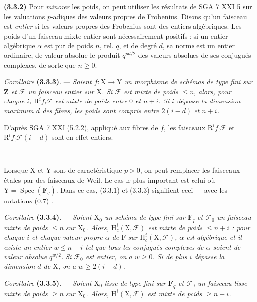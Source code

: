 \documentclass[11pt,leqno]{article}
\newcommand{\Page}[1]{\ifvmode\noindent\else\unskip\ \fi{\footnotesize\textcolor{gray}{[p.\,#1]}}\ \ignorespaces}
\begin{document}
\textbf{(3.3.2)} Pour \textit{minorer} les poids, on peut utiliser les résultats de SGA 7 XXI 5 sur les valuations \(p\)-adiques des valeurs propres de Frobenius. Disons qu’un faisceau est \textit{entier} si les valeurs propres des Frobenius sont des entiers algébriques. Les poids d’un faisceau mixte entier sont nécessairement positifs : si un entier algébrique \(\alpha\) est pur de poids \(n\), rel. \(q\), et de degré \(d\), sa norme est un entier ordinaire, de valeur absolue le produit \(q^{nd/2}\) des valeurs absolues de ses conjugués complexes, de sorte que \(n\geq0\).

\textit{Corollaire} \textbf{(3.3.3)}. — \textit{Soient \(f:\mathrm{X}\to\mathrm{Y}\) un morphisme de schémas de type fini sur \(\mathbf{Z}\) et \(\mathscr{F}\) un faisceau entier sur \(\mathrm{X}\). Si \(\mathscr{F}\) est mixte de poids \(\leq n\), alors, pour chaque \(i\), \(\mathrm{R}^if_!\mathscr{F}\) est mixte de poids entre \(0\) et \(n+i\). Si \(i\) dépasse la dimension maximum \(d\) des fibres, les poids sont compris entre \(2(i-d)\) et \(n+i\).}

D’après SGA 7 XXI (5.2.2), appliqué aux fibres de \(f\), les faisceaux \(\mathrm{R}^if_!\mathscr{F}\) et \(\mathrm{R}^if_!\mathscr{F}(i-d)\) sont en effet entiers.

\Page{206}

Lorsque \(\mathrm{X}\) et \(\mathrm{Y}\) sont de caractéristique \(p>0\), on peut remplacer les faisceaux étales par des faisceaux de Weil. Le cas le plus important est celui où \(\mathrm{Y}=\operatorname{Spec}(\mathbf{F}_q)\). Dans ce cas, (3.3.1) et (3.3.3) signifient ceci — avec les notations (0.7) :

\textit{Corollaire} \textbf{(3.3.4)}. — \textit{Soient \(\mathrm{X}_0\) un schéma de type fini sur \(\mathbf{F}_q\) et \(\mathscr{F}_0\) un faisceau mixte de poids \(\leq n\) sur \(\mathrm{X}_0\). Alors, \(\mathrm{H}_c^i(\mathrm{X},\mathscr{F})\) est mixte de poids \(\leq n+i\) : pour chaque \(i\) et chaque valeur propre \(\alpha\) de \(\mathrm{F}\) sur \(\mathrm{H}_c^i(\mathrm{X},\mathscr{F})\), \(\alpha\) est algébrique et il existe un entier \(w\leq n+i\) tel que tous les conjugués complexes de \(\alpha\) soient de valeur absolue \(q^{w/2}\). Si \(\mathscr{F}_0\) est entier, on a \(w\geq0\). Si de plus \(i\) dépasse la dimension \(d\) de \(\mathrm{X}\), on a \(w\geq2(i-d)\).}

\textit{Corollaire} \textbf{(3.3.5)}. — \textit{Soient \(\mathrm{X}_0\) lisse de type fini sur \(\mathbf{F}_q\) et \(\mathscr{F}_0\) un faisceau lisse mixte de poids \(\geq n\) sur \(\mathrm{X}_0\). Alors, \(\mathrm{H}^i(\mathrm{X},\mathscr{F})\) est mixte de poids \(\geq n+i\).}
\end{document}
